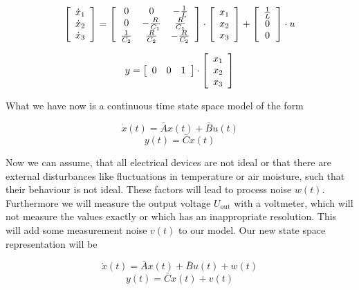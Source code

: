 \documentclass{article}
\begin{document}
\[ \left[
\begin{array}{c}
\dot{x}_1 \\
\dot{x}_2 \\
\dot{x}_3 \\
\end{array} \right]
= \left[
\begin{array}{c c c}
0 & 0 & -\frac{1}{L} \\
0 & -\frac{R}{C_1} & \frac{R}{C_1} \\
\frac{1}{C_2} & \frac{R}{C_2} & -\frac{R}{C_2} \\
\end{array}
\right]
\cdot \left[
\begin{array}{c}
x_1 \\
x_2 \\
x_3 \\
\end{array} \right]
+ \left[
\begin{array}{c}
\frac{1}{L} \\
0 \\
0 \\
\end{array} \right]
\cdot u
\]

\[
y = \left[
\begin{array}{c c c}
0 & 0 & 1 \\
\end{array}
\right] \cdot \left[
\begin{array}{c}
x_1 \\
x_2 \\
x_3 \\
\end{array} \right]
\]

What we have now is a continuous time state space model of the form

\[\dot{x}(t) = \bar{A}x(t) + \bar{B}u(t)\]
\[y(t) = \bar{C}x(t)\]

Now we can assume, that all electrical devices are not ideal or that there are external disturbances like fluctuations in temperature or air moisture, such that their behaviour is not ideal. These factors will lead to process noise \(w(t)\). Furthermore we will measure the output voltage \(U_{\text{out}}\) with a voltmeter, which will not measure the values exactly or which has an inappropriate resolution. This will add some measurement noise \(v(t)\) to our model. Our new state space representation will be

\[\dot{x}(t) = \bar{A}x(t) + \bar{B}u(t) + w(t)\]
\[y(t) = \bar{C}x(t) + v(t)\]
\end{document}
